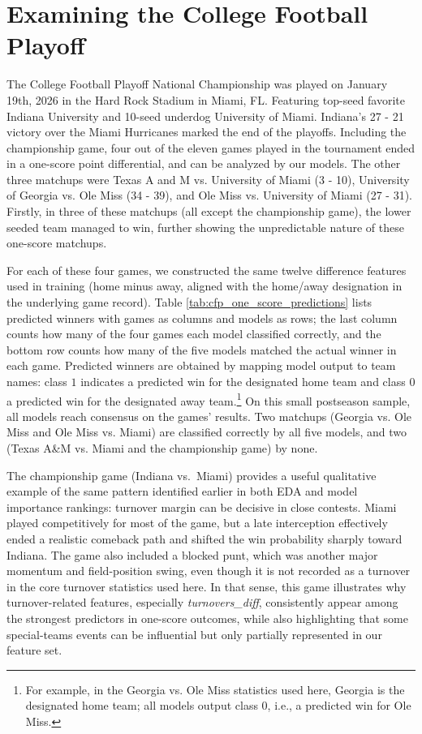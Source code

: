 \documentclass[11pt]{amsart}
\theoremstyle{definition}                  %
\theoremstyle{remark}                       %
\numberwithin{equation}{section}
\begin{document}
\section{Examining the College Football Playoff}
The College Football Playoff National Championship was played on January 19th, 2026 in the Hard Rock Stadium in Miami, FL. Featuring top-seed favorite Indiana University and 10-seed underdog University of Miami. Indiana's 27 - 21 victory over the Miami Hurricanes marked the end of the playoffs. Including the championship game, four out of the eleven games played in the tournament ended in a one-score point differential, and can be analyzed by our models. The other three matchups were Texas A and M vs. University of Miami (3 - 10), University of Georgia vs. Ole Miss (34 - 39), and Ole Miss vs. University of Miami (27 - 31). Firstly, in three of these matchups (all except the championship game), the lower seeded team managed to win, further showing the unpredictable nature of these one-score matchups.

For each of these four games, we constructed the same twelve difference features used in training (home minus away, aligned with the home/away designation in the underlying game record). Table \ref{tab:cfp_one_score_predictions} lists predicted winners with games as columns and models as rows; the last column counts how many of the four games each model classified correctly, and the bottom row counts how many of the five models matched the actual winner in each game. Predicted winners are obtained by mapping model output to team names: class $1$ indicates a predicted win for the designated home team and class $0$ a predicted win for the designated away team.\footnote{For example, in the Georgia vs. Ole Miss statistics used here, Georgia is the designated home team; all models output class $0$, i.e., a predicted win for Ole Miss.} On this small postseason sample, all models reach consensus on the games' results. Two matchups (Georgia vs. Ole Miss and Ole Miss vs. Miami) are classified correctly by all five models, and two (Texas A\&M vs. Miami and the championship game) by none.

The championship game (Indiana vs.\ Miami) provides a useful qualitative example of the same pattern identified earlier in both EDA and model importance rankings: turnover margin can be decisive in close contests. Miami played competitively for most of the game, but a late interception effectively ended a realistic comeback path and shifted the win probability sharply toward Indiana. The game also included a blocked punt, which was another major momentum and field-position swing, even though it is not recorded as a turnover in the core turnover statistics used here. In that sense, this game illustrates why turnover-related features, especially \textit{turnovers\_diff}, consistently appear among the strongest predictors in one-score outcomes, while also highlighting that some special-teams events can be influential but only partially represented in our feature set.
\end{document}
